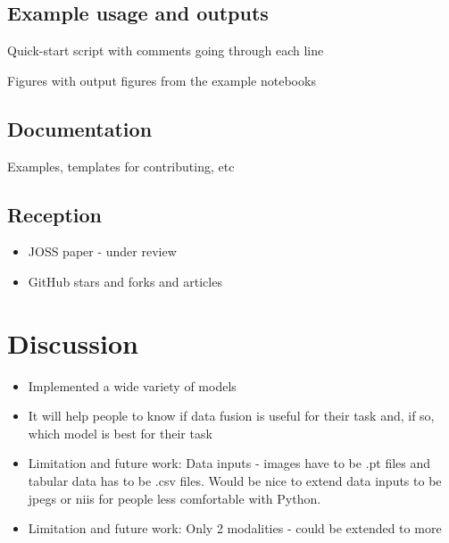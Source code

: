 \subsection{Example usage and outputs}
Quick-start script with comments going through each line

Figures with output figures from the example notebooks

\subsection{Documentation}
Examples, templates for contributing, etc


\subsection{Reception}
\begin{itemize}
    \item JOSS paper - under review 
    \item GitHub stars and forks and articles
\end{itemize}

\section{Discussion}
\begin{itemize}
    \item Implemented a wide variety of models
    \item It will help people to know if data fusion is useful for their task and, if so, which model is best for their task
    \item Limitation and future work: Data inputs - images have to be .pt files and tabular data has to be .csv files. Would be nice to extend data inputs to be jpegs or niis for people less comfortable with Python.
    \item Limitation and future work: Only 2 modalities - could be extended to more
\end{itemize}

